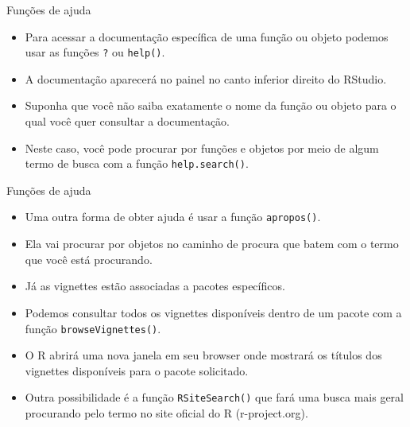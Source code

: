 \documentclass[
  ignorenonframetext,
  serif,
  professionalfont,
  usenames,
  dvipsnames,
  aspectratio = 169]{beamer}
\begin{document}
\begin{frame}[fragile]{Funções de ajuda}
\protect\hypertarget{funuxe7uxf5es-de-ajuda-2}{}
\begin{itemize}
\item
  Para acessar a documentação específica de uma função ou objeto podemos
  usar as funções \texttt{?} ou \texttt{help()}.
\item
  A documentação aparecerá no painel no canto inferior direito do
  RStudio.
\item
  Suponha que você não saiba exatamente o nome da função ou objeto para
  o qual você quer consultar a documentação.
\item
  Neste caso, você pode procurar por funções e objetos por meio de algum
  termo de busca com a função \texttt{help.search()}.
\end{itemize}
\end{frame}

\begin{frame}[fragile]{Funções de ajuda}
\protect\hypertarget{funuxe7uxf5es-de-ajuda-3}{}
\begin{itemize}
\item
  Uma outra forma de obter ajuda é usar a função \texttt{apropos()}.
\item
  Ela vai procurar por objetos no caminho de procura que batem com o
  termo que você está procurando.
\item
  Já as vignettes estão associadas a pacotes específicos.
\item
  Podemos consultar todos os vignettes disponíveis dentro de um pacote
  com a função \texttt{browseVignettes()}.
\item
  O R abrirá uma nova janela em seu browser onde mostrará os títulos dos
  vignettes disponíveis para o pacote solicitado.
\item
  Outra possibilidade é a função \texttt{RSiteSearch()} que fará uma
  busca mais geral procurando pelo termo no site oficial do R
  (r-project.org).
\end{itemize}
\end{frame}
\end{document}
